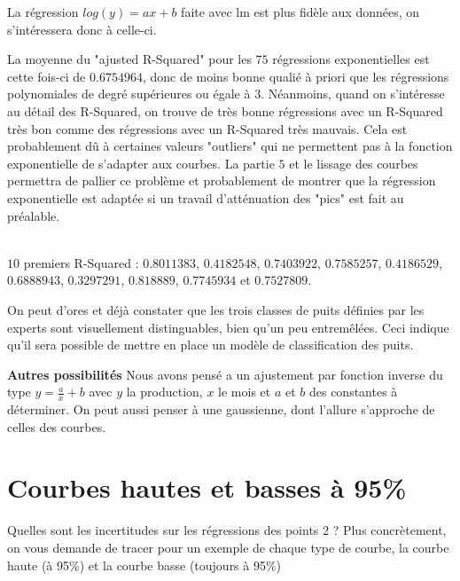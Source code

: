 \documentclass[12pt]{article}
\begin{document}
La r\'egression $log(y)=ax+b$ faite avec lm est plus fidèle aux données, on s'int\'eressera donc \`a celle-ci.
\newline 

La moyenne du "ajusted R-Squared" pour les $75$ r\'egressions exponentielles est cette fois-ci de $0.6754964$, donc de moins bonne quali\'e \`a priori que les r\'egressions polynomiales de degr\'e sup\'erieures ou \'egale \`a $3$. 
\newline
N\'eanmoins, quand on s'int\'eresse au d\'etail des R-Squared, on trouve de tr\`es bonne r\'egressions avec un R-Squared tr\`es bon comme des r\'egressions avec un R-Squared tr\`es mauvais. Cela est probablement d\^u à certaines valeurs "outliers" qui ne permettent pas \`a la fonction exponentielle de s'adapter aux courbes. 
\newline
La partie $5$ et le lissage des courbes permettra de pallier ce probl\`eme et probablement de montrer que la r\'egression exponentielle est adapt\'ee si un travail d'att\'enuation des "pics" est fait au pr\'ealable.
\newline

~\\
$10$ premiers R-Squared : 
\newline
$0.8011383$, $0.4182548$, $0.7403922$, $0.7585257$, $0.4186529$, $0.6888943$, $0.3297291$, $0.818889$, $0.7745934$ et $0.7527809$.
\newline

On peut d'ores et déjà constater que les trois classes de puits définies par les experts sont visuellement distinguables, bien qu'un peu entremêlées. Ceci indique qu'il sera possible de mettre en place un modèle de classification des puits.
\newline

\textbf{Autres possibilit\'es}
\newline
Nous avons pens\'e a un ajustement par fonction inverse du type $y = \frac{a}{x} + b$ avec $y$ la production, $x$ le mois et $a$ et $b$ des constantes à déterminer. On peut aussi penser à une gaussienne, dont l'allure s'approche de celles des courbes.



\newpage

\section{Courbes hautes et basses \`a 95\%}

Quelles sont les incertitudes sur les r\'egressions des points 2 ? Plus concr\`etement, on
vous demande de tracer pour un exemple de chaque type de courbe, la courbe haute (\`a
95\%) et la courbe basse (toujours \`a 95\%)
\end{document}
